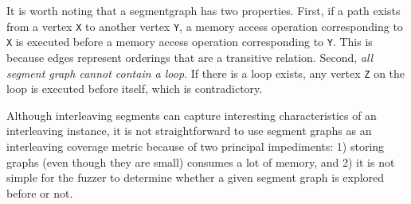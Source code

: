 It is worth noting that a segmentgraph has two properties. First, if
a path exists from a vertex \texttt{X} to another vertex \texttt{Y}, a
memory access operation corresponding to \texttt{X} is executed before
a memory access operation corresponding to \texttt{Y}.
%
\dr{}
This is because edges represent orderings that are a transitive
relation.
%
Second, \textit{all segment graph cannot contain a loop}.
%
If there is a loop exists, any vertex \texttt{Z} on the loop is
executed before itself, which is contradictory.


%



%
Although interleaving segments can capture interesting characteristics
of an interleaving instance, it is not straightforward to use segment
graphs as an interleaving coverage metric because of two principal
impediments: 1) storing graphs (even though they are small) consumes a
lot of memory, and 2) it is not simple for the fuzzer to determine
whether a given segment graph is explored before or not.



